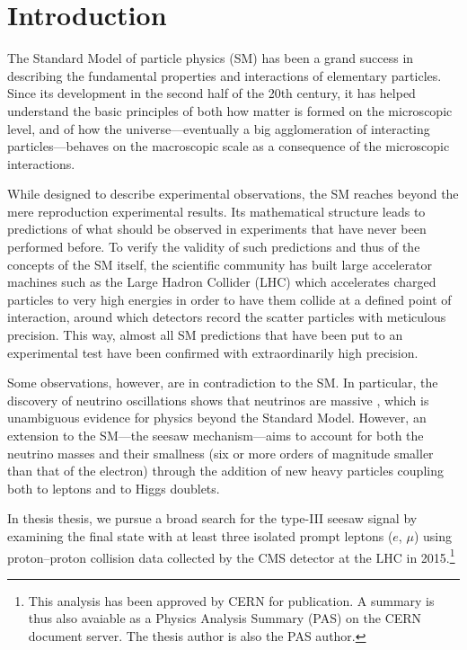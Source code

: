 \chapter{Introduction}
\label{sec:Introduction}

The Standard Model of particle physics (SM) \cite{i2003gauge,aitchison2003gauge,Peskin:257493} has been a grand success in describing the fundamental properties and interactions of elementary particles. Since its development in the second half of the 20th century, it has helped understand the basic principles of both how matter is formed on the microscopic level, and of how the universe\hairspace---\hairspace{}eventually a big agglomeration of interacting particles\hairspace---\hairspace{}behaves on the macroscopic scale as a consequence of the microscopic interactions.

While designed to describe experimental observations, the SM reaches beyond the mere reproduction experimental results. Its mathematical structure leads to predictions of what should be observed in experiments that have never been performed before. To verify the validity of such predictions and thus of the concepts of the SM itself, the scientific community has built large accelerator machines such as the Large Hadron Collider (LHC) \cite{Evans:2008zzb} which accelerates charged particles to very high energies in order to have them collide at a defined point of interaction, around which detectors record the scatter particles with meticulous precision. This way, almost all SM predictions that have been put to an experimental test have been confirmed with extraordinarily high precision.

Some observations, however, are in contradiction to the SM. In particular, the discovery of neutrino oscillations shows that neutrinos are massive \cite{Nustatus}, which is unambiguous evidence for physics beyond the Standard Model. However, an extension to the SM\hairspace---\hairspace{}the seesaw mechanism\hairspace---\hairspace{}aims to account for both the neutrino masses and their smallness (six or more orders of magnitude smaller than that of the electron) through the addition of new heavy particles coupling both to leptons and to Higgs doublets.

In thesis thesis, we pursue a broad search for the type-III seesaw signal \cite{SeesawIII:a} by examining the final state with at least three isolated prompt leptons ($e$, $\mu$) using proton--proton collision data collected by the CMS detector \cite{Chatrchyan:2008zzk} at the LHC in 2015.\footnote{This analysis has been approved by CERN for publication. A summary is thus also avaiable as a Physics Analysis Summary (PAS) \cite{CMS-PAS-EXO-16-002} on the CERN document server. The thesis author is also the PAS author.}

